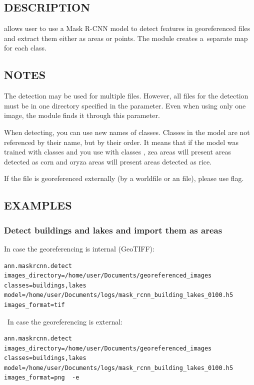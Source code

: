 \subsection*{DESCRIPTION}
 allows user to use a Mask R-CNN model to
detect features in georeferenced files and extract them either as areas or
points. The module creates a~separate map for each class. 

\subsection*{NOTES}
The detection may be used for multiple files. However, all files for the
detection must be in one directory specified in the
 parameter. Even when using only one
image, the module finds it through this parameter. 

When detecting, you can use new names of classes. Classes in the model are not
referenced by their name, but by their order. It means that if the model was
trained with classes  and you use
 with classes
, zea areas will present areas detected as corn
and oryza areas will present areas detected as rice. 

If the file is georeferenced externally (by a worldfile or an
 file), please use  flag. 

\subsection*{EXAMPLES}
\subsubsection*{Detect buildings and lakes and import them as areas}
In case the georeferencing is internal (GeoTIFF): 

{\footnotesize
\begin{lstlisting}[breaklines=true]
ann.maskrcnn.detect images_directory=/home/user/Documents/georeferenced_images classes=buildings,lakes model=/home/user/Documents/logs/mask_rcnn_building_lakes_0100.h5 images_format=tif
\end{lstlisting}
}

\ \linebreak In case the georeferencing is external: 

{\footnotesize
\begin{lstlisting}[breaklines=true]
ann.maskrcnn.detect images_directory=/home/user/Documents/georeferenced_images classes=buildings,lakes model=/home/user/Documents/logs/mask_rcnn_building_lakes_0100.h5 images_format=png  -e
\end{lstlisting}
}

